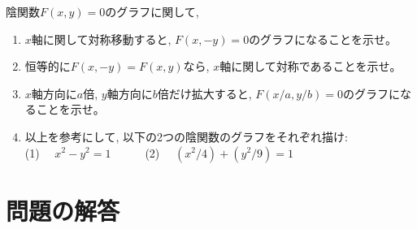 
\begin{exq}\label{q:func_imp_th2} 陰関数$F(x, y)=0$のグラフに関して, 
\begin{enumerate}
\item $x$軸に関して対称移動すると, $F(x, -y)=0$のグラフになることを示せ。
\item 恒等的に$F(x, -y)=F(x, y)$なら, $x$軸に関して対称であることを示せ。
\item $x$軸方向に$a$倍, $y$軸方向に$b$倍だけ拡大すると, $F(x/a, y/b)=0$のグラフになることを示せ。
\item 以上を参考にして, 以下の2つの陰関数のグラフをそれぞれ描け:\\
(1)　 $x^2-y^2=1$　　　(2)　 $(x^2/4)+(y^2/9)=1$
\end{enumerate}
\end{exq}\mv


\hv



\section*{問題の解答}

